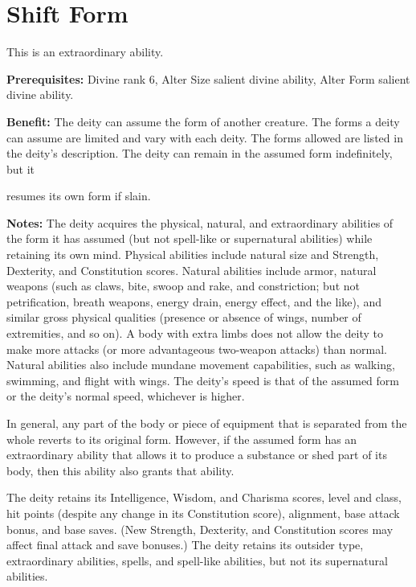 \documentclass{article}
\begin{document}
\vspace{12pt}
\section*{Shift Form}

This is an extraordinary ability.

\textbf{Prerequisites:} Divine rank 6, Alter Size salient divine ability, Alter 
Form salient divine ability.

\textbf{Benefit:} The deity can assume the form of another creature. The forms 
a deity can assume are limited and vary with each deity. The forms allowed are 
listed in the deity's description. The deity can remain in the assumed form indefinitely, 
but it

resumes its own form if slain.

\textbf{Notes:} The deity acquires the physical, natural, and extraordinary abilities 
of the form it has assumed (but not spell-like or supernatural abilities) while 
retaining its own mind. Physical abilities include natural size and Strength, Dexterity, 
and Constitution scores. Natural abilities include armor, natural weapons (such 
as claws, bite, swoop and rake, and constriction; but not petrification, breath 
weapons, energy drain, energy effect, and the like), and similar gross physical 
qualities (presence or absence of wings, number of extremities, and so on). A body 
with extra limbs does not allow the deity to make more attacks (or more advantageous 
two-weapon attacks) than normal. Natural abilities also include mundane movement 
capabilities, such as walking, swimming, and flight with wings. The deity's speed 
is that of the assumed form or the deity's normal speed, whichever is higher.

In general, any part of the body or piece of equipment that is separated from the 
whole reverts to its original form. However, if the assumed form has an extraordinary 
ability that allows it to produce a substance or shed part of its body, then this 
ability also grants that ability. 

The deity retains its Intelligence, Wisdom, and Charisma scores, level and class, 
hit points (despite any change in its Constitution score), alignment, base attack 
bonus, and base saves. (New Strength, Dexterity, and Constitution scores may affect 
final attack and save bonuses.) The deity retains its outsider type, extraordinary 
abilities, spells, and spell-like abilities, but not its supernatural abilities.
\end{document}
